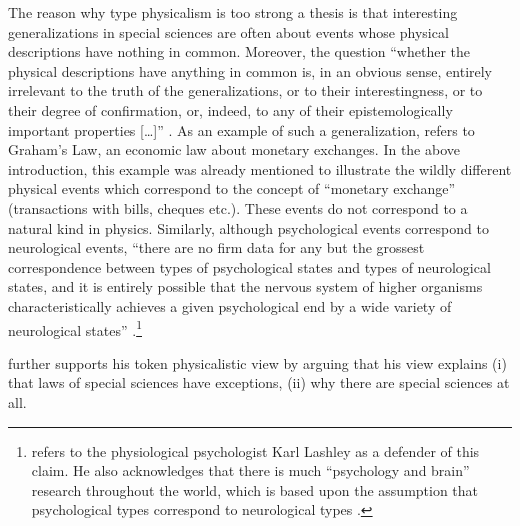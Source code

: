 \documentclass[output=paper]{langscibook}
\begin{document}
\largerpage[1]The reason why type physicalism is too strong a thesis is that interesting generalizations in special sciences are often about events whose physical descriptions have nothing in common. Moreover, the question ``whether the physical descriptions have anything in common is, in an obvious sense, entirely irrelevant to the truth of the generalizations, or to their interestingness, or to their degree of confirmation, or, indeed, to any of their epistemologically important properties […]'' \citep[103]{Fodor1974}. As an example of such a generalization, {\Fodor} refers to Graham's Law, an economic law about monetary exchanges. In the above introduction, this example was already mentioned to illustrate the wildly different physical events which correspond to the concept of ``monetary exchange'' (transactions with bills, cheques etc.). These events do not correspond to a natural kind in physics. Similarly, although psychological events correspond to neurological events, ``there are no firm data for any but the grossest correspondence between types of psychological states and types of neurological states, and it is entirely possible that the nervous system of higher organisms characteristically achieves a given psychological end by a wide variety of neurological states'' \citep[105]{Fodor1974}.\footnote{{\Fodor} refers to the physiological psychologist Karl Lashley as a defender of this claim. He also acknowledges that there is much ``psychology and brain'' research throughout the world, which is based upon the assumption that psychological types correspond to neurological types \citep[105]{Fodor1974}.\label{fn:elffers:physpsych}}

{\Fodor} further supports his token physicalistic view by arguing that his view explains (i) that laws of special sciences have exceptions, (ii) why there are special sciences at all.
\end{document}
